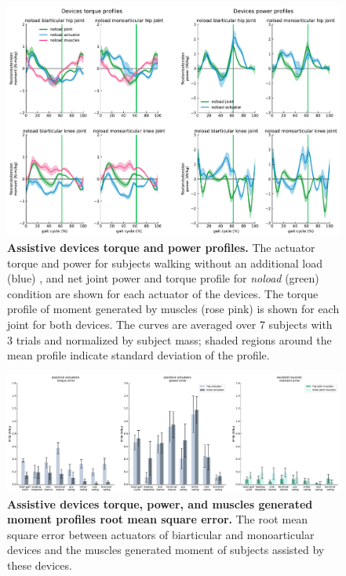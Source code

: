 \documentclass[10pt,letterpaper]{article}
\begin{document}
\begin{figure}[ht]   
	\centering
	\includegraphics[width=\linewidth]{Case_Studies/NoloadMono06_NoloadBi12/PaperFigure_Profiles.pdf}
	\vspace{1mm}
	\caption{{\small\textbf{Assistive devices torque and power profiles.} The actuator torque and power for subjects walking without an additional load (blue) , and net joint power and torque profile for \textit{noload} (green) condition are shown for each actuator of the devices. The torque profile of moment generated by muscles (rose pink) is shown for each joint for both devices. The curves are averaged over 7 subjects with 3 trials and normalized by subject mass; shaded regions around the mean profile indicate standard deviation of the profile.}}
	\label{Fig_Case02_Torque_Power_Profiles}
\end{figure}
\begin{figure}[ht]   
	\centering
	\includegraphics[width=\linewidth]{Case_Studies/NoloadMono06_NoloadBi12/RMSE.pdf}
	\vspace{1mm}
	\caption{\small{\textbf{Assistive devices torque, power, and muscles generated moment profiles root mean square error. } The root mean square error between actuators of biarticular and monoarticular devices and the muscles generated moment of subjects assisted by these devices.}}
	\label{Fig_Case02_RMSE}
\end{figure} 
\end{document}

